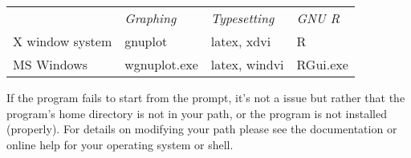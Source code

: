 \begin{center}
  \begin{tabular}{llll}
    & \textit{Graphing} & \textit{Typesetting} & \textit{GNU R}\\
    X window system & gnuplot & latex, xdvi & R\\
    MS Windows & wgnuplot.exe & latex, windvi & RGui.exe\\
  \end{tabular}
\end{center}


If the program fails to start from the prompt, it's not a 
issue but rather that the program's home directory is not in your
path, or the program is not installed (properly).  For details on
modifying your path please see the documentation or online help for
your operating system or shell.
    

